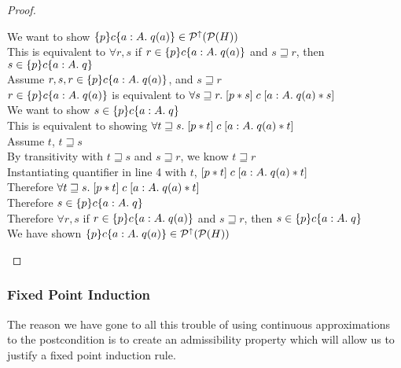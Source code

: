 \begin{proof}
\begin{tabbedproof}
\oo We want to show $\{{p}\}{c}\{{a:A}.\;{q(a)}\} \in \mathcal{P}^{\uparrow}({\mathcal{P}(H)})$ \\
\oo This is equivalent to $\forall r,s$ if $r \in \{{p}\}{c}\{{a:A}.\;{q(a)}\}$ and $s \sqsupseteq r$,
then $s \in \{{p}\}{c}\{{a:A}.\;{q}\}$ \\
\oo Assume $r,s, r \in \{{p}\}{c}\{{a:A}.\;{q(a)}\}$, and $s \sqsupseteq r$ \\
\ooo $r \in \{{p}\}{c}\{{a:A}.\;{q(a)}\}$ is equivalent to 
     $\forall s \sqsupseteq r.\; [{p * s}]\;{c}\;[{a:A}.\;{q(a) * s}]$ \\
\ooo We want to show $s \in \{{p}\}{c}\{{a:A}.\;{q}\}$ \\
\ooo This is equivalent to showing 
     $\forall t \sqsupseteq s.\; [{p * t}]\;{c}\;[{a:A}.\;{q(a) * t}]$ \\
\ooo Assume $t$, $t \sqsupseteq s$ \\
\oooo By transitivity with $t \sqsupseteq s$ and $s \sqsupseteq r$, we know $t \sqsupseteq r$ \\
\oooo Instantiating quantifier in line 4 with $t$, $[{p * t}]\;{c}\;[{a:A}.\;{q(a) * t}]$ \\
\ooo Therefore $\forall t \sqsupseteq s.\; [{p * t}]\;{c}\;[{a:A}.\;{q(a) * t}]$ \\
\ooo Therefore $s \in \{{p}\}{c}\{{a:A}.\;{q}\}$ \\
\oo Therefore $\forall r,s$ if $r \in \{{p}\}{c}\{{a:A}.\;{q(a)}\}$ and $s \sqsupseteq r$,
    then $s \in \{{p}\}{c}\{{a:A}.\;{q}\}$ \\
\oo We have shown $\{{p}\}{c}\{{a:A}.\;{q(a)}\} \in \mathcal{P}^{\uparrow}({\mathcal{P}(H)})$ \\ 
\end{tabbedproof}
\end{proof}

\subsubsection{Fixed Point Induction}

The reason we have gone to all this trouble of using continuous
approximations to the postcondition is to create an admissibility
property which will allow us to justify a fixed point induction rule.

